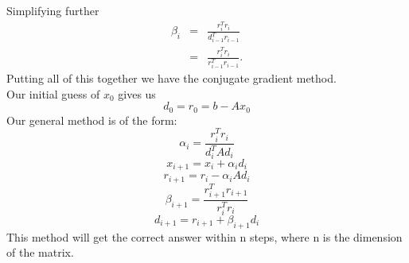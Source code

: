 Simplifying further
\begin{eqnarray*}
\beta_i &= &\frac{r^T_ir_i}{d^T_{i-1}r_{i-1}}\\
 &= &\frac{r^T_ir_i}{r^T_{i-1}r_{i-1}}.
\end{eqnarray*}
Putting all of this together we have the conjugate gradient method.\\
Our initial guess of $x_0$ gives us
\[d_0 = r_0 = b-Ax_0 \]
Our general method is of the form:
\[\alpha_i = \frac{r_i^Tr_i}{d_i^TAd_i} \]
\[x_{i+1} = x_i + \alpha_id_i \]
\[r_{i+1} =r_i -\alpha_iAd_i \]
\[\beta_{i+1} = \frac{r^T_{i+1}r_{i+1}}{r^T_{i}r_{i}}\]
\[d_{i+1}=r_{i+1}+\beta_{i+1}d_i \]
This method will get the correct answer within n steps, where n is the dimension
of the matrix.

